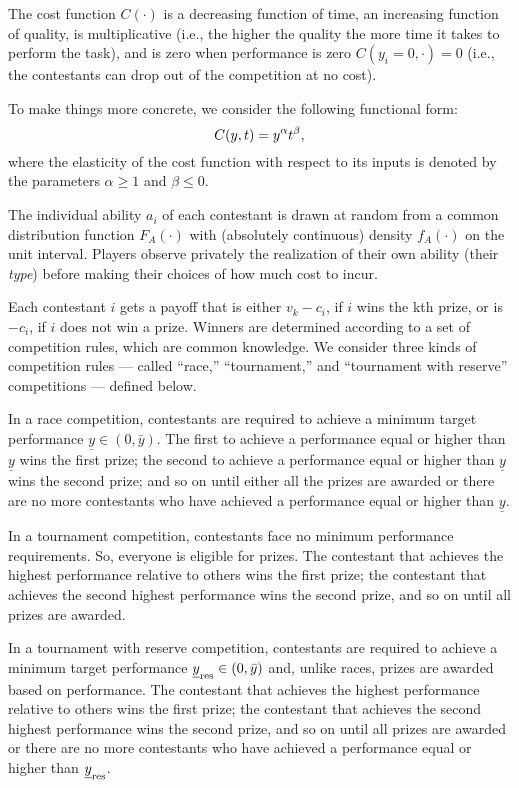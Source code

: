 \documentclass[11pt, titlepage]{article}
\newcommand\target{\underline{y}}
\begin{document}
The cost function \(C(\cdot)\) is a decreasing function of time, an
increasing function of quality, is multiplicative (i.e., the higher the
quality the more time it takes to perform the task), and is zero when
performance is zero \(C(y_i=0, \cdot)=0\) (i.e., the contestants can
drop out of the competition at no cost).

To make things more concrete, we consider the following functional form:
\[
    C(y, t) = y^\alpha t^\beta,
\] where the elasticity of the cost function with respect to its inputs
is denoted by the parameters \(\alpha\geq1\) and \(\beta\leq0\).

The individual ability \(a_i\) of each contestant is drawn at random
from a common distribution function \(F_A(\cdot)\) with (absolutely
continuous) density \(f_A(\cdot)\) on the unit interval. Players observe
privately the realization of their own ability (their \emph{type})
before making their choices of how much cost to incur.

Each contestant \(i\) gets a payoff that is either \(v_k - c_i\), if
\(i\) wins the kth prize, or is \(-c_i\), if \(i\) does not win a prize.
Winners are determined according to a set of competition rules, which
are common knowledge. We consider three kinds of competition rules ---
called ``race,'' ``tournament,'' and ``tournament with reserve''
competitions --- defined below.

\begin{definition}[Races]
In a race competition, contestants are required to achieve a minimum target performance $\target\in(0, \bar y)$. The first to achieve a performance equal or higher than $\target$ wins the first prize; the second to achieve a performance equal or higher than $\target$ wins the second prize; and so on until either all the prizes are awarded or there are no more contestants who have achieved a performance equal or higher than $\target$.
\end{definition}

\begin{definition}[Tournaments]
In a tournament competition, contestants face no minimum performance requirements. So, everyone is eligible for prizes. The contestant that achieves the highest performance relative to others wins the first prize; the contestant that achieves the second highest performance wins the second prize, and so on until all prizes are awarded.
\end{definition}

\begin{definition}
In a tournament with reserve competition, contestants are required to achieve a minimum target performance $\target_{\reserve}\in(0,\bar y)$ and, unlike races, prizes are awarded based on performance. The contestant that achieves the highest performance relative to others wins the first prize; the contestant that achieves the second highest performance wins the second prize, and so on until all prizes are awarded  or there are no more contestants who have achieved a performance equal or higher than $\target_{\reserve}$.
\end{definition}
\end{document}
